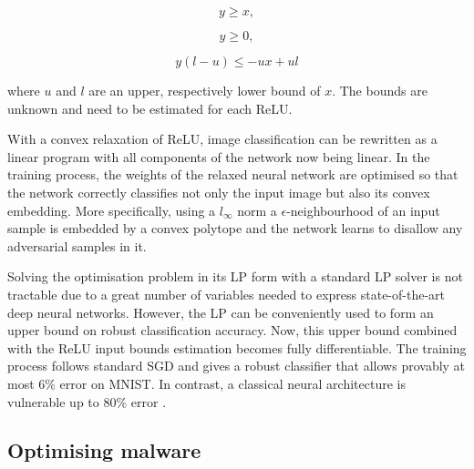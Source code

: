 \begin{equation}
y \geq x,
\end{equation}

\begin{equation}
y \geq 0,
\end{equation}

\begin{equation}
y(l-u) \leq -ux + ul
\end{equation}

where $u$ and $l$ are an upper, respectively lower bound of $x$.
The bounds are unknown and need to be estimated for each ReLU.

With a convex relaxation of ReLU, image classification can be rewritten
as a linear program with all components of the network now being linear.
In the training process, the weights of the relaxed neural network are
optimised so that the network correctly classifies not only the input
image but also its convex embedding. More specifically, using a
$l_\infty$ norm a $\epsilon$-neighbourhood of an input sample is
embedded by a convex polytope and the network learns to disallow any
adversarial samples in it.

Solving the optimisation problem in its LP form with a standard LP
solver is not tractable due to a great number of variables needed to
express state-of-the-art deep neural networks. However, the LP can be
conveniently used to form an upper bound on robust classification
accuracy. Now, this upper bound combined with the ReLU input bounds
estimation becomes fully differentiable. The training process follows
standard SGD and gives a robust classifier that allows provably at most
6\% error on MNIST. In contrast, a classical neural architecture is
vulnerable up to 80\% error \cite{provable_defenses}.

\subsection{Optimising malware}

